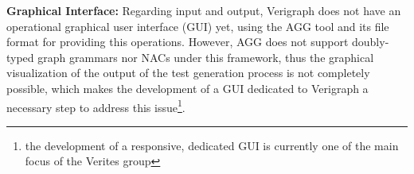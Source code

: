 \textbf{Graphical Interface:} Regarding input and output, Verigraph does not have an operational graphical user interface (GUI) yet, using the AGG tool and its  file format for providing this operations. However, AGG does not support doubly-typed graph grammars nor NACs under this framework, thus the graphical visualization of the output of the test generation process is not completely possible, which makes the development of a GUI dedicated to Verigraph a necessary step to address this issue\footnote{the development
  of a responsive, dedicated GUI is currently one of the main focus of the Verites group}.





